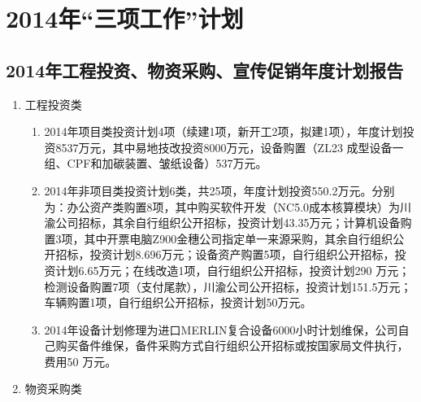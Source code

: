 ﻿\chapter{2014年“三项工作”计划}
\section{2014年工程投资、物资采购、宣传促销年度计划报告}


\renewcommand{\labelenumi}{\indent \chinese{enumi}}
\begin{enumerate}
 \setlength{\parsep}{0ex} %
 \setlength{\topsep}{1ex} %
 \setlength{\itemsep}{0.5ex} %

\item 工程投资类
  \begin{enumerate}[1、]
  \item 2014年项目类投资计划4项（续建1项，新开工2项，拟建1项），年度计划投资8537万元，其中易地技改投资8000万元，设备购置（ZL23 成型设备一组、CPF和加碳装置、皱纸设备）537万元。
  \item 2014年非项目类投资计划6类，共25项，年度计划投资550.2万元。分别为：办公资产类购置8项，其中购买软件开发（NC5.0成本核算模块）为川渝公司招标，其余自行组织公开招标，投资计划43.35万元；计算机设备购置3项，其中开票电脑Z900金穗公司指定单一来源采购，其余自行组织公开招标，投资计划8.696万元；设备资产购置5项，自行组织公开招标，投资计划6.65万元；在线改造1项，自行组织公开招标，投资计划290 万元；检测设备购置7项（支付尾款），川渝公司公开招标，投资计划151.5万元；车辆购置1项，自行组织公开招标，投资计划50万元。
  \item 2014年设备计划修理为进口MERLIN复合设备6000小时计划维保，公司自己购买备件维保，备件采购方式自行组织公开招标或按国家局文件执行，费用50 万元。
\end{enumerate}


\item 物资采购类


\end{enumerate}
